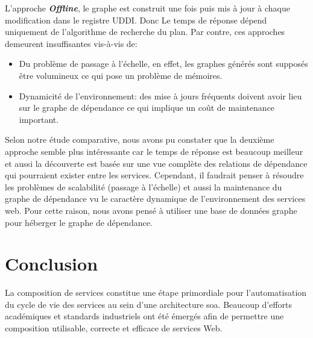   L'approche \textbf{\textit{Offline}}, le graphe est construit une
  fois puis mis à jour à chaque modification dans le registre
  UDDI. Donc Le temps de réponse dépend uniquement de l'algorithme de
  recherche du plan. Par contre, ces approches demeurent insuffisantes
  vis-à-vis de:\medskip

  \SpecialItem
  \begin{itemize}
  \item Du problème de passage à l'échelle, en effet, les graphes
    générés sont supposés être volumineux ce qui pose un problème de
    mémoires.

  \item Dynamicité de l'environnement: des mise à jours fréquents
    doivent avoir lieu sur le graphe de dépendance ce qui implique un
    coût de maintenance important.\bigskip

  \end{itemize}
  \enddescription

\newpage

\newpage


Selon notre étude comparative, nous avons pu constater que la deuxième
approche semble plus intéressante car le temps de réponse est beaucoup
meilleur et aussi la découverte est basée sur une vue complète des
relations de dépendance qui pourraient exister entre les services.
Cependant, il faudrait penser à résoudre les problèmes de scalabilité
(passage à l'échelle) et aussi la maintenance du graphe de dépendance
vu le caractère dynamique de l'environnement des services web.  Pour
cette raison, nous avons pensé à utiliser une base de données graphe
pour héberger le graphe de dépendance.

\section*{Conclusion}
\label{sec:conclusion}
 

La composition de services constitue une étape primordiale pour
l'automatisation du cycle de vie des services au sein d'une
architecture \acrshort{soa}. Beaucoup d'efforts académiques et
standards industriels ont été émergés afin de permettre une
composition utilisable, correcte et efficace de services Web.\medskip

